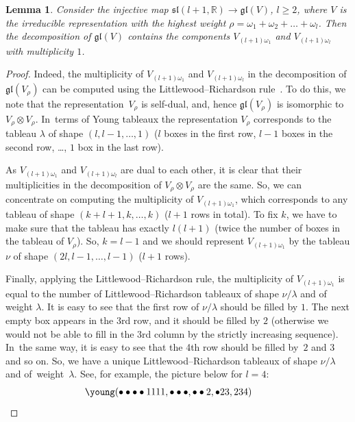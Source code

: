 \documentclass[pdftex]{sigma}%
\newcommand{\R}{\mathbb R}
\newcommand{\gl}{\mathfrak{gl}}
\newtheorem{lem}[thm]{Lemma}
\numberwithin{equation}{section}
\begin{document}
\begin{lem}
	Consider the injective map $\mathfrak{sl}(l+1,\R)\to \gl(V)$, $l\ge2$, where $V$ is the irreducible representation with the highest weight $\rho=\omega_1+\omega_2+\dots+\omega_l$. Then the decomposition of $\gl(V)$ contains the components $V_{(l+1)\omega_1}$ and $V_{(l+1)\omega_l}$ with multiplicity $1$.
\end{lem}
\begin{proof}
	Indeed, the multiplicity of $V_{(l+1)\omega_1}$ and $V_{(l+1)\omega_l}$ in the decomposition of $\gl(V_{\rho})$ can be computed using the Littlewood--Richardson rule~\cite{fulton}. To do this, we note that the representation~$V_\rho$ is self-dual, and, hence $\gl(V_\rho)$ is isomorphic to $V_{\rho}\otimes V_{\rho}$. In~terms of Young tableaux the representation $V_{\rho}$ corresponds to the tableau $\lambda$ of shape $(l,l-1,\dots,1)$ ($l$ boxes in the first row, $l-1$ boxes in the second row, \dots, $1$ box in the last row).
	
	As $V_{(l+1)\omega_1}$ and $V_{(l+1)\omega_l}$ are dual to each other, it is clear that their multiplicities in the decomposition of $V_{\rho}\otimes V_{\rho}$ are the same. So, we can concentrate on computing the multiplicity of $V_{(l+1)\omega_1}$, which corresponds to any tableau of shape $(k+l+1,k,\dots,k)$ ($l+1$ rows in total). To fix $k$, we have to make sure that the tableau has exactly $l(l+1)$ (twice the number of boxes in the tableau of $V_{\rho}$). So, $k=l-1$ and we should represent $V_{(l+1)\omega_1}$ by the tableau $\nu$ of shape $(2l,l-1,\dots,l-1)$ ($l+1$ rows).
	
	Finally, applying the Littlewood--Richardson rule, the multiplicity of $V_{(l+1)\omega_1}$ is equal to the number of Littlewood--Richardson tableaux of shape $\nu/\lambda$ and of weight $\lambda$. It is easy to see that the first row of $\nu/\lambda$ should be filled by $1$. The next empty box appears in the 3rd row, and it should be filled by $2$ (otherwise we would not be able to fill in the 3rd column by the strictly increasing sequence). In~the same way, it is easy to see that the 4th row should be filled by~$2$ and $3$ and so on. So, we have a unique Littlewood--Richardson tableaux of shape $\nu/\lambda$ and of~weight~$\lambda$. See, for example, the picture below for $l=4$:
	\begin{gather*}
	\young(\bullet\bullet\bullet\bullet 1111,\bullet\bullet\bullet,\bullet\bullet 2,\bullet 23,234)\tag*{\qed}
\end{gather*}
\renewcommand{\qed}{}
\end{proof}
\end{document}
